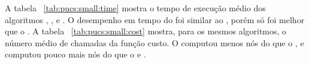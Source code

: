 A tabela ~\ref{tab:pucs:small:time} mostra o tempo de execução médio
dos algoritmos , ,  e
. O desempenho em tempo do  foi similar
ao , porém só foi melhor que o . A tabela 
~\ref{tab:pucs:small:cost} mostra, para os mesmos algoritmos, o número 
médio de chamadas da função custo. O  computou menos nós 
do que o , e computou pouco mais nós do que o  
e .


\begin{table}
\centering
\footnotesize
{}
\end{table}

